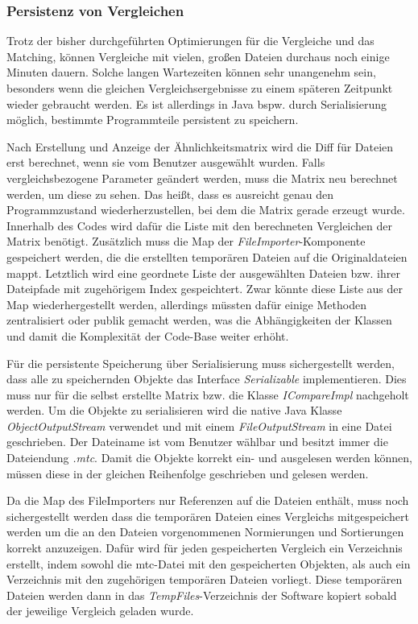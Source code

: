 \subsubsection{Persistenz von Vergleichen}

Trotz der bisher durchgeführten Optimierungen für die Vergleiche und das Matching, können Vergleiche mit vielen, großen Dateien durchaus noch einige Minuten dauern. Solche langen Wartezeiten können sehr unangenehm sein, besonders wenn die gleichen Vergleichsergebnisse zu einem späteren Zeitpunkt wieder gebraucht werden. Es ist allerdings in Java bspw. durch Serialisierung möglich, bestimmte Programmteile persistent zu speichern. 

Nach Erstellung und Anzeige der Ähnlichkeitsmatrix wird die Diff für Dateien erst berechnet, wenn sie vom Benutzer ausgewählt wurden. Falls vergleichsbezogene Parameter geändert werden, muss die Matrix neu berechnet werden, um diese zu sehen. Das heißt, dass es ausreicht genau den Programmzustand wiederherzustellen, bei dem die Matrix gerade erzeugt wurde. Innerhalb des Codes wird dafür die Liste mit den berechneten Vergleichen der Matrix benötigt. Zusätzlich muss die Map der \emph{FileImporter}-Komponente gespeichert werden, die die erstellten temporären Dateien auf die Originaldateien mappt. Letztlich wird eine geordnete Liste der ausgewählten Dateien  bzw. ihrer Dateipfade mit zugehörigem Index gespeichtert. Zwar könnte diese Liste aus der Map wiederhergestellt werden, allerdings müssten dafür einige Methoden zentralisiert oder publik gemacht werden, was die Abhängigkeiten der Klassen und damit die Komplexität der Code-Base weiter erhöht.

Für die persistente Speicherung über Serialisierung muss sichergestellt werden, dass alle zu speichernden Objekte das Interface \emph{Serializable} implementieren. Dies muss nur für die selbst erstellte Matrix bzw. die Klasse \emph{ICompareImpl} nachgeholt werden. Um die Objekte zu serialisieren wird die native Java Klasse \emph{ObjectOutputStream} verwendet und mit einem \emph{FileOutputStream} in eine Datei geschrieben. Der Dateiname ist vom Benutzer wählbar und besitzt immer die Dateiendung \emph{.mtc}. Damit die Objekte korrekt ein- und ausgelesen werden können, müssen diese in der gleichen Reihenfolge geschrieben und gelesen werden.

Da die Map des FileImporters nur Referenzen auf die Dateien enthält, muss noch sichergestellt werden dass die temporären Dateien eines Vergleichs mitgespeichert werden um die an den Dateien vorgenommenen Normierungen und Sortierungen korrekt anzuzeigen. Dafür wird für jeden gespeicherten Vergleich ein Verzeichnis erstellt, indem sowohl die mtc-Datei mit den gespeicherten Objekten, als auch ein Verzeichnis mit den zugehörigen temporären Dateien vorliegt. Diese temporären Dateien werden dann in das \emph{TempFiles}-Verzeichnis der Software kopiert sobald der jeweilige Vergleich geladen wurde.

